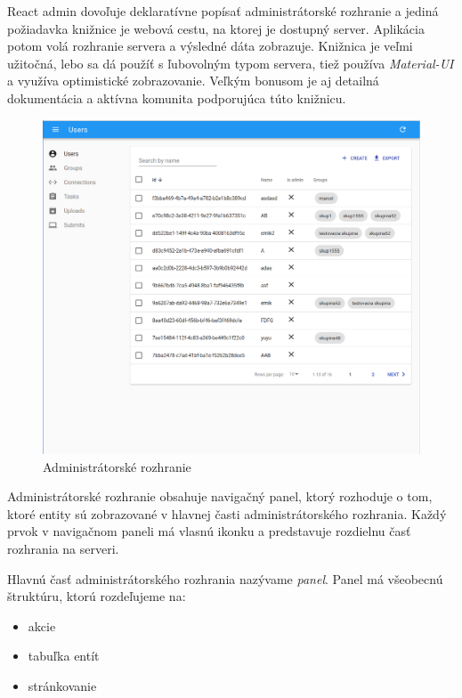React admin dovoľuje deklaratívne popísať administrátorské rozhranie a jediná požiadavka knižnice je
webová cestu, na ktorej je dostupný server. Aplikácia potom volá rozhranie servera a výsledné dáta
zobrazuje. Knižnica je veľmi užitočná, lebo sa dá použíť s ľubovolným typom servera, tiež používa
\textit{Material-UI} a využíva optimistické zobrazovanie. Veľkým bonusom je aj detailná dokumentácia
a aktívna komunita podporujúca túto knižnicu.

\begin{figure}[H]
\centerline{\includegraphics[width=1\textwidth]{images/administratorske_rozhranie}}
\caption[Administrátorské rozhranie]{Administrátorské rozhranie}
\label{obr:administratorske_rozhranie}
\end{figure}

Administrátorské rozhranie obsahuje navigačný panel, ktorý rozhoduje o tom, ktoré entity sú
zobrazované v hlavnej časti administrátorského rozhrania. Každý prvok v navigačnom paneli má vlasnú
ikonku a predstavuje rozdielnu časť rozhrania na serveri.

Hlavnú časť administrátorského rozhrania nazývame \textit{panel}. Panel má všeobecnú štruktúru,
ktorú rozdeľujeme na:
\begin{itemize}
  \item akcie
  \item tabuľka entít
  \item stránkovanie
\end{itemize}

